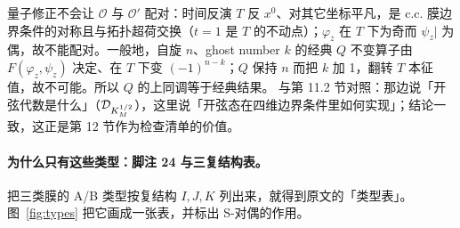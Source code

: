 量子修正不会让 \(\mathcal O\) 与 \(\mathcal O'\) 配对：时间反演 \(T\) 反 \(x^0\)、对其它坐标平凡，是 c.c. 膜边界条件的对称且与拓扑超荷交换（\(t=1\) 是 \(T\) 的不动点）；\(\varphi_z\) 在 \(T\) 下为奇而 \(\psi_z|\) 为偶，故不能配对。一般地，自旋 \(n\)、ghost number \(k\) 的经典 \(Q\) 不变算子由 \(F(\varphi_z,\psi_z)\) 决定、在 \(T\) 下变 \((-1)^{n-k}\)；\(Q\) 保持 \(n\) 而把 \(k\) 加 1，翻转 \(T\) 本征值，故不可能。所以 \(Q\) 的上同调等于经典结果。\pA{} 与第 11.2 节对照：那边说「开弦代数是什么」（\(\mathcal{D}_{K_M^{1/2}}\)），这里说「开弦态在四维边界条件里如何实现」；结论一致，这正是第 12 节作为检查清单的价值。\pB{}

\paragraph{为什么只有这些类型：脚注 24 与三复结构表。}把三类膜的 A/B 类型按复结构 \(I,J,K\) 列出来，就得到原文的「类型表」。图~\ref{fig:types} 把它画成一张表，并标出 S-对偶的作用。


